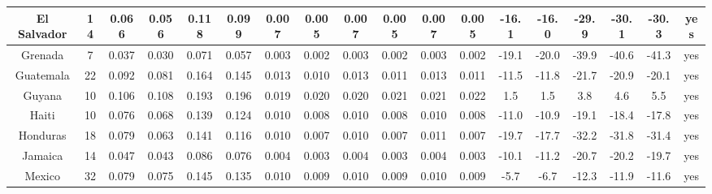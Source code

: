 \documentclass[10pt]{article}
\begin{document}
\begin{center}
\begin{tabular}{|c|c|c|c|c|c|c|c|c|c|c|c|c|c|c|c|c|c|}
\hline
El Salvador & 14 & 0.066 & 0.056 & 0.118 & 0.099 & 0.007 & 0.005 & 0.007 & 0.005 & 0.007 & 0.005 & -16.1 & -16.0 & -29.9 & -30.1 & -30.3 & yes \\
\hline
Grenada & 7 & 0.037 & 0.030 & 0.071 & 0.057 & 0.003 & 0.002 & 0.003 & 0.002 & 0.003 & 0.002 & -19.1 & -20.0 & -39.9 & -40.6 & -41.3 & yes \\
\hline
Guatemala & 22 & 0.092 & 0.081 & 0.164 & 0.145 & 0.013 & 0.010 & 0.013 & 0.011 & 0.013 & 0.011 & -11.5 & -11.8 & -21.7 & -20.9 & -20.1 & yes \\
\hline
Guyana & 10 & 0.106 & 0.108 & 0.193 & 0.196 & 0.019 & 0.020 & 0.020 & 0.021 & 0.021 & 0.022 & 1.5 & 1.5 & 3.8 & 4.6 & 5.5 & yes \\
\hline
Haiti & 10 & 0.076 & 0.068 & 0.139 & 0.124 & 0.010 & 0.008 & 0.010 & 0.008 & 0.010 & 0.008 & -11.0 & -10.9 & -19.1 & -18.4 & -17.8 & yes \\
\hline
Honduras & 18 & 0.079 & 0.063 & 0.141 & 0.116 & 0.010 & 0.007 & 0.010 & 0.007 & 0.011 & 0.007 & -19.7 & -17.7 & -32.2 & -31.8 & -31.4 & yes \\
\hline
Jamaica & 14 & 0.047 & 0.043 & 0.086 & 0.076 & 0.004 & 0.003 & 0.004 & 0.003 & 0.004 & 0.003 & -10.1 & -11.2 & -20.7 & -20.2 & -19.7 & yes \\
\hline
Mexico & 32 & 0.079 & 0.075 & 0.145 & 0.135 & 0.010 & 0.009 & 0.010 & 0.009 & 0.010 & 0.009 & -5.7 & -6.7 & -12.3 & -11.9 & -11.6 & yes \\
\hline
\end{tabular}
\end{center}
\end{document}
